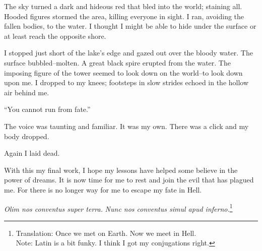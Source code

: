 \documentclass{article}
\begin{document}
The sky turned a dark and hideous red that bled into the world;
staining all.  Hooded figures stormed the area, killing everyone in sight.
I ran, avoiding the fallen bodies, to the water.
I thought I might be able to hide under the surface or at least
reach the opposite shore.


I stopped just short of the lake's edge and gazed out over the bloody water.
The surface bubbled--molten.
A great black spire erupted from the water.
The imposing figure of the tower seemed to look down on the world--to
look down upon me.
I dropped to my knees;
footsteps in slow strides echoed in the hollow air behind me.
\VV


``You cannot run from fate.''
\VV


\noindent
The voice was taunting and familiar.
It was my own.
There was a click and my body dropped.


Again I laid dead.
\vvvv


\noindent
With this my final work,
I hope my lessons have helped some believe in the power of dreams.
It is now time for me to rest and join the evil that has plagued me.
For there is no longer way for me to escape my fate in Hell.
\VV

\begin{center}
\textit{Olim nos conventus super terra.}
\textit{Nunc nos conventus simul apud inferno.}\footnote{
Translation:  Once we met on Earth. Now we meet in Hell. \\
\indent
Note: Latin is a bit funky.  I think I got my conjugations right.
}
\end{center}
\end{document}
